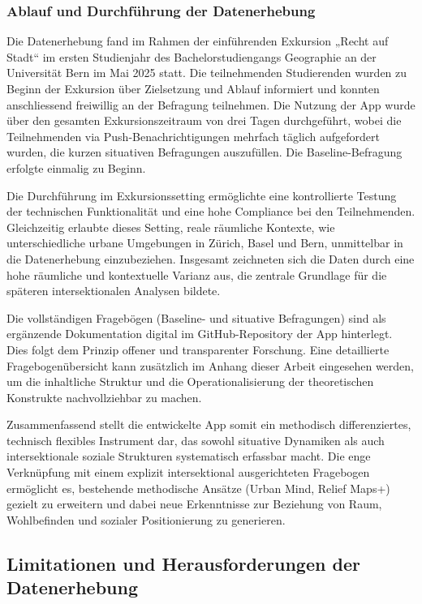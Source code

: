 \subsubsection{Ablauf und Durchführung der Datenerhebung}

Die Datenerhebung fand im Rahmen der einführenden Exkursion „Recht auf Stadt“ im ersten Studienjahr des Bachelorstudiengangs Geographie an der Universität Bern im Mai 2025 statt. Die teilnehmenden Studierenden wurden zu Beginn der Exkursion über Zielsetzung und Ablauf informiert und konnten anschliessend freiwillig an der Befragung teilnehmen. Die Nutzung der App wurde über den gesamten Exkursionszeitraum von drei Tagen durchgeführt, wobei die Teilnehmenden via Push-Benachrichtigungen mehrfach täglich aufgefordert wurden, die kurzen situativen Befragungen auszufüllen. Die Baseline-Befragung erfolgte einmalig zu Beginn.

Die Durchführung im Exkursionssetting ermöglichte eine kontrollierte Testung der technischen Funktionalität und eine hohe Compliance bei den Teilnehmenden. Gleichzeitig erlaubte dieses Setting, reale räumliche Kontexte, wie unterschiedliche urbane Umgebungen in Zürich, Basel und Bern, unmittelbar in die Datenerhebung einzubeziehen. Insgesamt zeichneten sich die Daten durch eine hohe räumliche und kontextuelle Varianz aus, die zentrale Grundlage für die späteren intersektionalen Analysen bildete.

Die vollständigen Fragebögen (Baseline- und situative Befragungen) sind als ergänzende Dokumentation digital im GitHub-Repository der App hinterlegt. Dies folgt dem Prinzip offener und transparenter Forschung. Eine detaillierte Fragebogenübersicht kann zusätzlich im Anhang dieser Arbeit eingesehen werden, um die inhaltliche Struktur und die Operationalisierung der theoretischen Konstrukte nachvollziehbar zu machen.

Zusammenfassend stellt die entwickelte App somit ein methodisch differenziertes, technisch flexibles Instrument dar, das sowohl situative Dynamiken als auch intersektionale soziale Strukturen systematisch erfassbar macht. Die enge Verknüpfung mit einem explizit intersektional ausgerichteten Fragebogen ermöglicht es, bestehende methodische Ansätze (Urban Mind, Relief Maps+) gezielt zu erweitern und dabei neue Erkenntnisse zur Beziehung von Raum, Wohlbefinden und sozialer Positionierung zu generieren.


\subsection{Limitationen und Herausforderungen der Datenerhebung}

